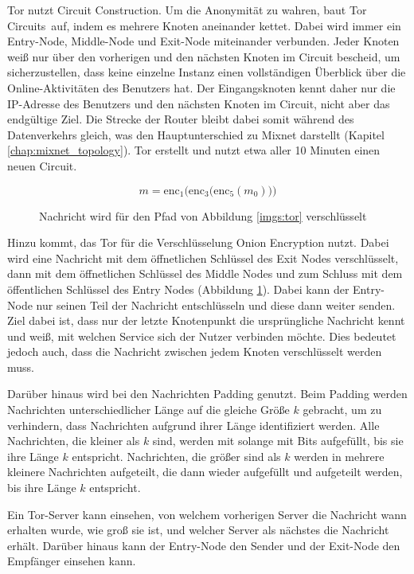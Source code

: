 Tor nutzt Circuit Construction. Um die Anonymität zu wahren, baut Tor \glqq Circuits\grqq\ auf, indem es mehrere Knoten aneinander kettet. Dabei wird immer ein Entry-Node, Middle-Node und Exit-Node miteinander verbunden. Jeder Knoten weiß nur über den vorherigen und den nächsten Knoten im Circuit bescheid, um sicherzustellen, dass keine einzelne Instanz einen vollständigen Überblick über die Online-Aktivitäten des Benutzers hat. Der Eingangsknoten kennt daher nur die IP-Adresse des Benutzers und den nächsten Knoten im Circuit, nicht aber das endgültige Ziel. Die Strecke der Router bleibt dabei somit während des Datenverkehrs gleich, was den Hauptunterschied zu Mixnet darstellt (Kapitel \ref{chap:mixnet_topology}). Tor erstellt und nutzt etwa aller 10 Minuten einen neuen Circuit.

\begin{figure}[!h]
    \begin{displaymath}
        m = \mathrm{enc}_{1}\Big(\mathrm{enc}_{3}\big(\mathrm{enc}_{5}(m_0)\big)\Big)
    \end{displaymath}
    \caption{Nachricht wird für den Pfad von Abbildung \ref{imgs:tor} verschlüsselt}
    \label{equa:encryption}
\end{figure}

Hinzu kommt, das Tor für die Verschlüsselung Onion Encryption nutzt. Dabei wird eine Nachricht mit dem öffnetlichen Schlüssel des Exit Nodes verschlüsselt, dann mit dem öffnetlichen Schlüssel des Middle Nodes und zum Schluss mit dem öffentlichen Schlüssel des Entry Nodes (Abbildung \ref{equa:encryption}). Dabei kann der Entry-Node nur seinen Teil der Nachricht entschlüsseln und diese dann weiter senden. Ziel dabei ist, dass nur der letzte Knotenpunkt die ursprüngliche Nachricht kennt und weiß, mit welchen Service sich der Nutzer verbinden möchte. Dies bedeutet jedoch auch, dass die Nachricht zwischen jedem Knoten verschlüsselt werden muss.

Darüber hinaus wird bei den Nachrichten Padding genutzt. Beim Padding werden Nachrichten unterschiedlicher Länge auf die gleiche Größe $k$ gebracht, um zu verhindern, dass Nachrichten aufgrund ihrer Länge identifiziert werden. Alle Nachrichten, die kleiner als $k$ sind, werden mit solange mit Bits aufgefüllt, bis sie ihre Länge $k$ entspricht. Nachrichten, die größer sind als $k$ werden in mehrere kleinere Nachrichten aufgeteilt, die dann wieder aufgefüllt und aufgeteilt werden, bis ihre Länge $k$ entspricht.

Ein Tor-Server kann einsehen, von welchem vorherigen Server die Nachricht wann erhalten wurde, wie groß sie ist, und welcher Server als nächstes die Nachricht erhält. Darüber hinaus kann der Entry-Node den Sender und der Exit-Node den Empfänger einsehen kann.

